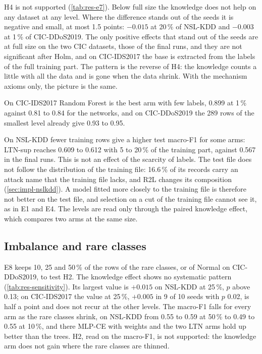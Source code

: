 H4 is not supported (\cref{tab:res-e7}). Below full size the knowledge does not help on any dataset at any level.
Where the difference stands out of the seeds it is negative and small, at most 1.5 points: $-0.015$ at 20\,\% of
NSL-KDD and $-0.003$ at 1\,\% of CIC-DDoS2019. The only positive effects that stand out of the seeds are at full size on the two CIC
datasets, those of the final runs, and they are not significant after Holm, and on CIC-IDS2017 the base is extracted from the labels of the
full training part. The pattern is the reverse of H4: the knowledge counts a little with all the data and is gone
when the data shrink. With the mechanism axioms only, the picture is the same.

On CIC-IDS2017 Random Forest is the best arm with few labels, 0.899 at 1\,\% against 0.81 to 0.84 for the networks,
and on CIC-DDoS2019 the 289 rows of the smallest level already give 0.93 to 0.95.

On NSL-KDD fewer training rows give a higher test macro-F1 for some arms: LTN-sup reaches 0.609 to 0.612 with 5 to
20\,\% of the training part, against 0.567 in the final runs. This is not an effect of the scarcity of labels. The
test file does not follow the distribution of the training file: 16.6\,\% of its records carry an attack name that
the training file lacks, and R2L changes its composition (\cref{sec:impl-nslkdd}). A model fitted more closely to
the training file is therefore not better on the test file, and selection on a cut of the training file cannot see
it, as in E1 and E4. The levels are read only through the paired knowledge effect, which compares two arms at the same
size.

\subsection{Imbalance and rare classes}
\label{sec:res-imbalance}

E8 keeps 10, 25 and 50\,\% of the rows of the rare classes, or of Normal on CIC-DDoS2019, to test H2. The knowledge
effect shows no systematic pattern (\cref{tab:res-sensitivity}). Its largest value is $+0.015$ on NSL-KDD at 25\,\%,
$p$ above 0.13; on CIC-IDS2017 the value at 25\,\%, $+0.005$ in 9 of 10 seeds with $p$ 0.02, is half a point and does
not recur at the other levels. The macro-F1 falls for every arm as the rare classes shrink, on NSL-KDD from 0.55 to
0.59 at 50\,\% to 0.49 to 0.55 at 10\,\%, and there MLP-CE with weights and the two LTN arms hold up better than the
trees. H2, read on the macro-F1, is not supported: the knowledge arm does not gain where the rare classes are thinned.

